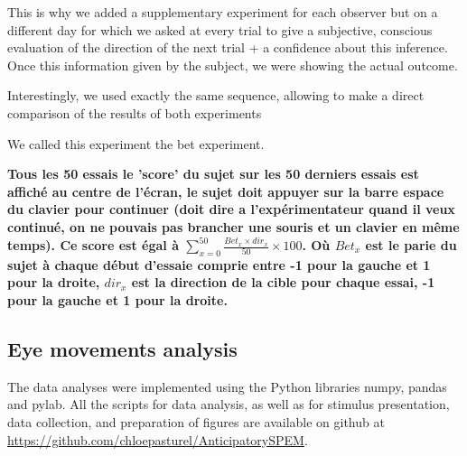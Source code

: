 \documentclass[12pt,english]{article}%
\begin{document}


This is why we added a supplementary experiment for each observer but on a different day for which we asked at every trial to give a subjective, conscious evaluation of the direction of the next trial + a confidence about this inference. Once this information given by the subject, we were showing the actual outcome.

Interestingly, we used exactly the same sequence, allowing to make a direct comparison of the results of both experiments

We called this experiment the bet experiment.


\textbf{Tous les 50 essais le 'score' du sujet sur les 50 derniers essais est affiché au centre de l'écran, le sujet doit appuyer sur la barre espace du clavier pour continuer (doit dire a l'expérimentateur quand il veux continué, on ne pouvais pas brancher une souris et un clavier en même temps). Ce score est égal à $\sum_{x=0}^{50} \frac{Bet_{x} \times dir_x}{50} \times 100$. Où $Bet_x$ est le parie du sujet à chaque début d'essaie comprie entre -1 pour la gauche et 1 pour la droite, $dir_x$ est la direction de la cible pour chaque essai, -1 pour la gauche et 1 pour la droite.}


\subsection{Eye movements analysis}

The data analyses were implemented using the Python libraries numpy, pandas and pylab. All the scripts for data analysis, as well as for stimulus presentation, data collection, and preparation of figures are available on github at \url{https://github.com/chloepasturel/AnticipatorySPEM}.
 
\end{document}
